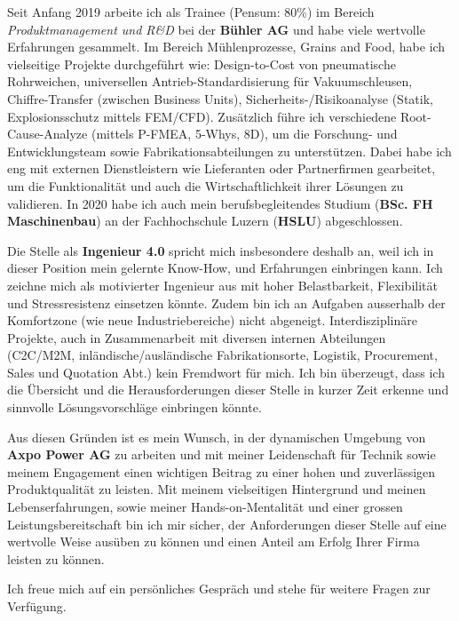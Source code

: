 \documentclass[11pt, a4paper]{awesome-cv}
\newcommand{\companyName}{Axpo Power AG}
\newcommand{\jobPosition}{Ingenieur 4.0}
\begin{document}
\makecvheader

\makelettertitle

\begin{cvletter}
	
Seit Anfang 2019 arbeite ich als Trainee (Pensum: 80\%) im Bereich \textit{Produktmanagement und R\&D} bei der  \textbf{Bühler AG} und habe viele wertvolle Erfahrungen gesammelt. Im Bereich Mühlenprozesse, Grains and Food, habe ich vielseitige Projekte durchgeführt wie: Design-to-Cost von pneumatische Rohrweichen, universellen Antrieb-Standardisierung für Vakuumschleusen, Chiffre-Transfer (zwischen Business Units), Sicherheits-/Risikoanalyse (Statik, Explosionsschutz mittels FEM/CFD). Zusätzlich führe ich verschiedene Root-Cause-Analyze (mittels P-FMEA, 5-Whys, 8D), um die Forschung- und Entwicklungsteam sowie Fabrikationsabteilungen zu unterstützen. Dabei habe ich eng mit externen Dienstleistern wie Lieferanten oder Partnerfirmen gearbeitet, um die Funktionalität und auch die Wirtschaftlichkeit ihrer Lösungen zu validieren. In 2020 habe ich auch mein berufsbegleitendes Studium (\textbf{BSc. FH Maschinenbau}) an der Fachhochschule Luzern (\textbf{HSLU}) abgeschlossen.

Die Stelle als \textbf{\jobPosition} spricht mich insbesondere deshalb an, weil ich in dieser Position mein gelernte Know-How, und Erfahrungen einbringen kann. Ich zeichne mich als motivierter Ingenieur aus mit hoher Belastbarkeit, Flexibilität und Stressresistenz einsetzen könnte. Zudem bin ich an Aufgaben ausserhalb der Komfortzone (wie neue Industriebereiche) nicht abgeneigt.  Interdisziplinäre Projekte, auch in Zusammenarbeit mit diversen internen Abteilungen (C2C/M2M, inländische/ausländische Fabrikationsorte, Logistik, Procurement, Sales und Quotation Abt.) kein Fremdwort für mich. Ich bin überzeugt, dass ich die Übersicht und die Herausforderungen dieser Stelle in kurzer Zeit erkenne und sinnvolle Lösungsvorschläge einbringen könnte. 

Aus diesen Gründen ist es mein Wunsch, in der dynamischen Umgebung von \textbf{\companyName} zu arbeiten und mit meiner Leidenschaft für Technik sowie meinem Engagement einen wichtigen Beitrag zu einer hohen und zuverlässigen Produktqualität zu leisten. Mit meinem vielseitigen Hintergrund und meinen Lebenserfahrungen, sowie meiner Hands-on-Mentalität und einer grossen Leistungsbereitschaft bin ich mir sicher, der Anforderungen dieser Stelle auf eine wertvolle Weise ausüben zu können und einen Anteil am Erfolg Ihrer Firma leisten zu können.

Ich freue mich auf ein persönliches Gespräch und stehe für weitere Fragen zur Verfügung.

\end{cvletter}

\makeletterclosing
\end{document}
